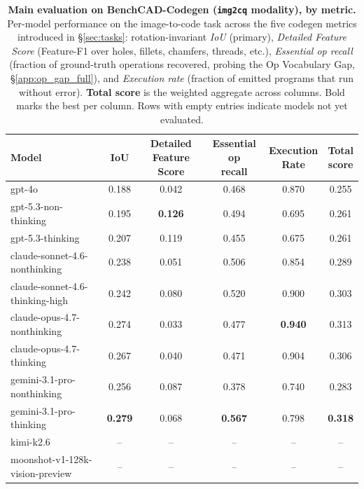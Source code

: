 \begin{table}[t]
\centering
\small
\setlength{\tabcolsep}{5pt}
\renewcommand{\arraystretch}{1.15}
\caption{\textbf{Main evaluation on BenchCAD-Codegen (\texttt{img2cq} modality), by metric.} Per-model performance on the image-to-code task across the five codegen metrics introduced in \S\ref{sec:tasks}: rotation-invariant \emph{IoU} (primary), \emph{Detailed Feature Score} (Feature-F1 over holes, fillets, chamfers, threads, etc.), \emph{Essential op recall} (fraction of ground-truth operations recovered, probing the Op Vocabulary Gap, \S\ref{app:op_gap_full}), and \emph{Execution rate} (fraction of emitted programs that run without error). \textbf{Total score} is the weighted aggregate across columns. Bold marks the best per column. Rows with empty entries indicate models not yet evaluated.}
\label{tab:main_eval_codegen}
\begin{tabular}{l c c c c c}
\toprule
Model
 & IoU
 & \shortstack{Detailed Feature\\Score}
 & \shortstack{Essential op\\recall}
 & \shortstack{Execution\\Rate}
 & \shortstack{Total\\score} \\
\midrule
gpt-4o                              & 0.188 & 0.042 & 0.468 & 0.870 & 0.255 \\
gpt-5.3-non-thinking                & 0.195 & \textbf{0.126} & 0.494 & 0.695 & 0.261 \\
gpt-5.3-thinking                    & 0.207 & 0.119 & 0.455 & 0.675 & 0.261 \\
claude-sonnet-4.6-nonthinking       & 0.238 & 0.051 & 0.506 & 0.854 & 0.289 \\
claude-sonnet-4.6-thinking-high     & 0.242 & 0.080 & 0.520 & 0.900 & 0.303 \\
claude-opus-4.7-nonthinking         & 0.274 & 0.033 & 0.477 & \textbf{0.940} & 0.313 \\
claude-opus-4.7-thinking            & 0.267 & 0.040 & 0.471 & 0.904 & 0.306 \\
gemini-3.1-pro-nonthinking          & 0.256 & 0.087 & 0.378 & 0.740 & 0.283 \\
gemini-3.1-pro-thinking             & \textbf{0.279} & 0.068 & \textbf{0.567} & 0.798 & \textbf{0.318} \\
kimi-k2.6                           & --    & --    & --    & --    & --    \\
moonshot-v1-128k-vision-preview     & --    & --    & --    & --    & --    \\
\bottomrule
\end{tabular}
\end{table}
